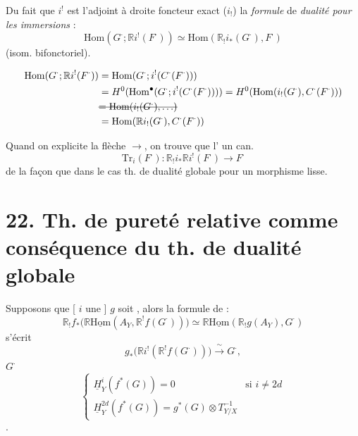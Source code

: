 \documentclass[11pt,a4paper]{article}
\begin{document}
Du fait que $i^!$ est l'adjoint à droite 
 foncteur exact \struck{\ill{}} ($i_!$) \ill{} la
\emph{formule} de \emph{dualité pour les immersions} :
\[
\boxed{\,\mathrm{Hom}(G^\cdot ; \mathbb{R} i^!(F^\cdot)) \simeq
\mathrm{Hom}(\mathbb{R}_! i_*(G^\cdot), F^\cdot)\,}
\]
(isom. bifonctoriel).

\begin{align*}
\mathrm{Hom}(G^\cdot ; \mathbb{R} i^!(F^\cdot))
&= \mathrm{Hom}(G^\cdot ; i^!(C^\cdot(F^\cdot))) \\
&= H^0(\mathrm{Hom}^\bullet(G^\cdot ; i^!(C^\cdot(F^\cdot))))
 = H^0(\mathrm{Hom}(i_!(G^\cdot), C^\cdot(F^\cdot))) \\
&\text{\struck{$= \mathrm{Hom}(i_!(G^\cdot), \ldots)$}} \\
&= \mathrm{Hom}(\mathbb{R} i_!(G^\cdot), C^\cdot(F^\cdot))
\end{align*}

Quand on explicite la flèche $\to$, on trouve que l'\ill{}
 \ill{} un  can.
\[
\mathrm{Tr}_i(F^\cdot) : \mathbb{R}_! i_* \mathbb{R} i^!(F^\cdot) \longrightarrow F^\cdot
\]
de la  façon que dans le cas  th. de dualité
globale pour un morphisme lisse.

\section{22. Th. de pureté relative comme conséquence du th. de dualité globale}


Supposons que [\ill{} $i$ une  ]
\ill{} $g$ soit \struck{\ill{}} \struck{\ill{}} \ill{}, alors la formule
de  \ill{} \ill{} :
\[
\mathbb{R}_! f_*\bigl(\mathbb{R}\underline{\mathrm{Hom}}(A_Y, \mathbb{R}^! f(G^\cdot))\bigr)
\simeq \mathbb{R}\underline{\mathrm{Hom}}(\mathbb{R}_! g(A_Y), G^\cdot)
\]
s'écrit
\[
g_*\bigl(\mathbb{R} i^!(\mathbb{R}^! f(G^\cdot))\bigr) \xrightarrow{\ \sim\ } G^\cdot ,
\]
\ill{} \ill{} $G^\cdot$ \ill{} \ill{} \ill{} \ill{}
\[
\begin{cases}
\underline{H}^i_Y(f^*(G)) = 0 & \text{si } i \neq 2d \\
\underline{H}^{2d}_Y(f^*(G)) = g^*(G) \otimes T^{-1}_{Y/X} &
\end{cases}
\]
\struck{\ill{}} \ill{}.
\end{document}
